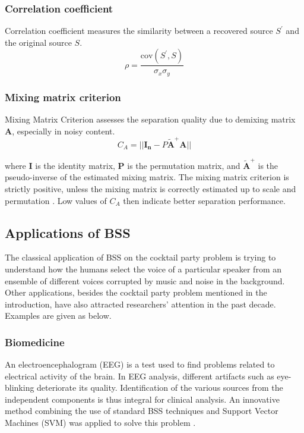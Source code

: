 \subsubsection{Correlation coefficient}
Correlation coefficient measures the similarity between a recovered source $S^{'}$ and the original source $S$.
\begin{equation}
    \rho = \frac{\text{cov}(S^{'},S)}{\sigma_x \sigma_y}
\end{equation}

\subsubsection{Mixing matrix criterion}
Mixing Matrix Criterion assesses the separation quality due to demixing matrix $\mathbf{A}$, especially in noisy content.
\begin{equation}
    C_A = ||\mathbf{I_n} - P\tilde{\mathbf{A}}^{+}\mathbf{A} ||
\end{equation}

where $\mathbf{I}$ is the identity matrix, $\mathbf{P}$ is the permutation matrix, and $\tilde{\mathbf{A}}^{+}$ is the pseudo-inverse of the estimated mixing matrix. The mixing matrix criterion is strictly positive, unless the mixing matrix is correctly estimated up to scale and permutation \cite{VAbolghasemi2012}. Low values of $C_A$ then indicate better separation performance.
 
\subsection{Applications of BSS}
The classical application of BSS on the cocktail party problem is trying to understand how the humans select the voice of a particular speaker from an ensemble of different voices corrupted by music and noise in the background. Other applications, besides the cocktail party problem mentioned in the introduction, have also attracted researchers' attention in the past decade. Examples are given as below.

\subsubsection{Biomedicine}
An electroencephalogram (EEG) is a test used to find problems related to electrical activity of the brain. In EEG analysis, different artifacts such as eye-blinking deteriorate its quality. Identification of the various sources from the independent components is thus integral for clinical analysis. An innovative method combining the use of standard BSS techniques and Support Vector Machines (SVM) was applied to solve this problem  \cite{Duda2000PC954544}.

